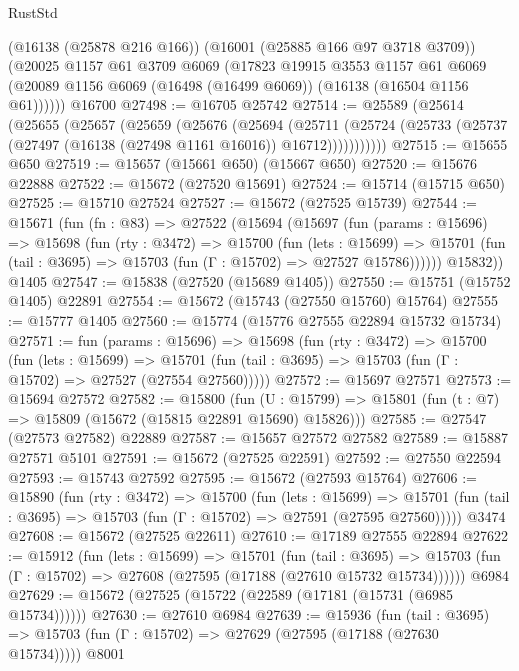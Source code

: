 \begin{lexlean}{RustStd}
\begin{coremodule}
      (@16138 (@25878 @216 @166))
      (@16001 (@25885 @166 @97 @3718 @3709))
      (@20025
        @1157
        @61
        @3709
        @6069
        (@17823
          @19915
          @3553
          @1157
          @61
          @6069
          (@20089 @1156 @6069 (@16498 (@16499 @6069)) (@16138 (@16504 @1156 @61))))))
    @16700
@27498 := @16705 @25742
@27514 := @25589
    (@25614
      (@25655
        (@25657
          (@25659
            (@25676
              (@25694
                (@25711
                  (@25724 (@25733 (@25737 (@27497 (@16138 (@27498 @1161 @16016)) @16712)))))))))))
@27515 := @15655 @650
@27519 := @15657 (@15661 @650) (@15667 @650)
@27520 := @15676 @22888
@27522 := @15672 (@27520 @15691)
@27524 := @15714 (@15715 @650)
@27525 := @15710 @27524
@27527 := @15672 (@27525 @15739)
@27544 := @15671
    (fun (fn : @83) =>
    @27522
      (@15694
        (@15697
          (fun (params : @15696) =>
          @15698
            (fun (rty : @3472) =>
            @15700
              (fun (lets : @15699) =>
              @15701 (fun (tail : @3695) => @15703 (fun (Γ : @15702) => @27527 @15786))))))
        @15832))
    @1405
@27547 := @15838 (@27520 (@15689 @1405))
@27550 := @15751 (@15752 @1405) @22891
@27554 := @15672 (@15743 (@27550 @15760) @15764)
@27555 := @15777 @1405
@27560 := @15774 (@15776 @27555 @22894 @15732 @15734)
@27571 := fun (params : @15696) =>
  @15698
    (fun (rty : @3472) =>
    @15700
      (fun (lets : @15699) =>
      @15701 (fun (tail : @3695) => @15703 (fun (Γ : @15702) => @27527 (@27554 @27560)))))
@27572 := @15697 @27571
@27573 := @15694 @27572
@27582 := @15800
    (fun (U : @15799) => @15801 (fun (t : @7) => @15809 (@15672 (@15815 @22891 @15690) @15826)))
@27585 := @27547 (@27573 @27582) @22889
@27587 := @15657 @27572 @27582
@27589 := @15887 @27571 @5101
@27591 := @15672 (@27525 @22591)
@27592 := @27550 @22594
@27593 := @15743 @27592
@27595 := @15672 (@27593 @15764)
@27606 := @15890
    (fun (rty : @3472) =>
    @15700
      (fun (lets : @15699) =>
      @15701 (fun (tail : @3695) => @15703 (fun (Γ : @15702) => @27591 (@27595 @27560)))))
    @3474
@27608 := @15672 (@27525 @22611)
@27610 := @17189 @27555 @22894
@27622 := @15912
    (fun (lets : @15699) =>
    @15701
      (fun (tail : @3695) =>
      @15703 (fun (Γ : @15702) => @27608 (@27595 (@17188 (@27610 @15732 @15734))))))
    @6984
@27629 := @15672 (@27525 (@15722 (@22589 (@17181 (@15731 (@6985 @15734))))))
@27630 := @27610 @6984
@27639 := @15936
    (fun (tail : @3695) => @15703 (fun (Γ : @15702) => @27629 (@27595 (@17188 (@27630 @15734)))))
    @8001

\end{coremodule}
\end{lexlean}
